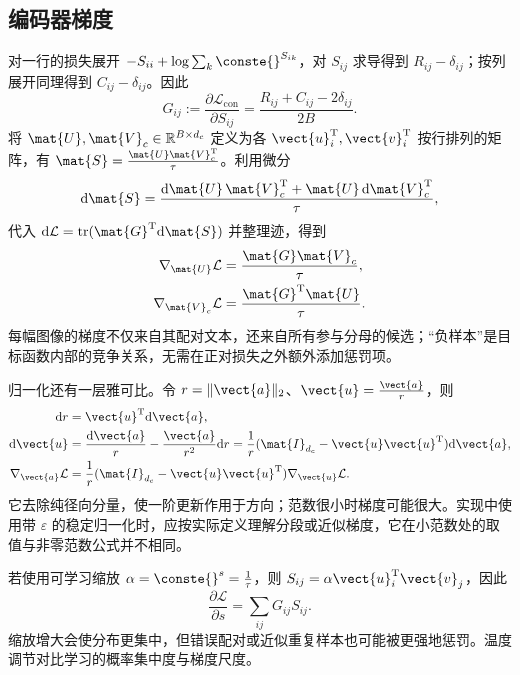 \documentclass[../textbook.tex]{subfiles}
\begin{document}
\subsection{编码器梯度}
对一行的损失展开 $-S_{ii}+\log\sum_k \conste{}^{S_{ik}}$，对 $S_{ij}$ 求导得到 $R_{ij}-\delta_{ij}$；按列展开同理得到 $C_{ij}-\delta_{ij}$。因此
\begin{equation}
 G_{ij}:=\frac{\partial\mathcal L_{\mathrm{con}}}{\partial S_{ij}}
 =\frac{R_{ij}+C_{ij}-2\delta_{ij}}{2B}.
 \label{eq:mm-logit-grad}
\end{equation}
将 $\mat{U},\mat{V}_c\in\mathbb R^{B\times d_c}$ 定义为各 $\vect{u}_i^{\mathrm{T}},\vect{v}_i^{\mathrm{T}}$ 按行排列的矩阵，有 $\mat{S}=\frac{\mat{U}\mat{V}_c^{\mathrm{T}}}{\tau}$。利用微分
\begin{equation}
 \mathrm d\mat{S}=\frac{\mathrm d\mat{U}\,\mat{V}_c^{\mathrm{T}}+\mat{U}\,\mathrm d\mat{V}_c^{\mathrm{T}}}{\tau},
\end{equation}
代入 $\mathrm d\mathcal L=\operatorname{tr}(\mat{G}^{\mathrm{T}}\mathrm d\mat{S})$ 并整理迹，得到
\begin{equation}
 \begin{aligned}
  \nabla_{\mat{U}}\mathcal L &= \frac{\mat{G}\mat{V}_c}{\tau}, \\
  \nabla_{\mat{V}_c}\mathcal L &= \frac{\mat{G}^{\mathrm{T}}\mat{U}}{\tau}.
 \end{aligned}
\end{equation}
每幅图像的梯度不仅来自其配对文本，还来自所有参与分母的候选；“负样本”是目标函数内部的竞争关系，无需在正对损失之外额外添加惩罚项。

归一化还有一层雅可比。令 $r=\|\vect{a}\|_2$、$\vect{u}=\frac{\vect{a}}{r}$，则
\begin{align}
 \mathrm dr&=\vect{u}^{\mathrm{T}}\mathrm d\vect{a},\\
 \mathrm d\vect{u}&=\frac{\mathrm d\vect{a}}{r}-\frac{\vect{a}}{r^2}\mathrm dr
 =\frac1r(\mat{I}_{d_c}-\vect{u}\vect{u}^{\mathrm{T}})\mathrm d\vect{a},\\
 \nabla_{\vect{a}}\mathcal L&=\frac1r(\mat{I}_{d_c}-\vect{u}\vect{u}^{\mathrm{T}})\nabla_{\vect{u}}\mathcal L.
 \label{eq:mm-normalize-grad}
\end{align}
它去除纯径向分量，使一阶更新作用于方向；范数很小时梯度可能很大。实现中使用带 $\varepsilon$ 的稳定归一化时，应按实际定义理解分段或近似梯度，它在小范数处的取值与非零范数公式并不相同。

若使用可学习缩放 $\alpha=\conste{}^s=\frac{1}{\tau}$，则 $S_{ij}=\alpha \vect{u}_i^{\mathrm{T}}\vect{v}_j$，因此
\begin{equation}
 \frac{\partial\mathcal L}{\partial s}=\sum_{ij}G_{ij}S_{ij}.
\end{equation}
缩放增大会使分布更集中，但错误配对或近似重复样本也可能被更强地惩罚。温度调节对比学习的概率集中度与梯度尺度。
\end{document}
